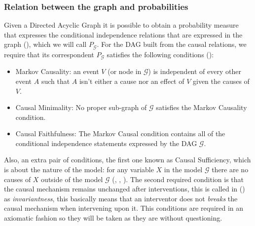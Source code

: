 \documentclass[english,letterpaper,12pt,final]{article}
\theoremstyle{definition}
\begin{document}
	\subsubsection{Relation between the graph and probabilities}
	Given a Directed Acyclic Graph it is possible to obtain a probability measure that expresses the conditional independence relations that are expressed in the graph (\cite{koller2009probabilistic}), which we will call $P_\mathcal{G}$. For the DAG built from the causal relations, we require that its correspondent $P_\mathcal{G}$ satisfies the following conditions (\cite{spirtes2000causation}):
	\begin{itemize}
	\item Markov Causality: an event $V$ (or node in $\mathcal{G}$) is independent of every other event $A$ such that $A$ isn't either a cause nor an effect of $V$ given the causes of $V$.
	\item Causal Minimality: No proper sub-graph of $\mathcal{G}$ satisfies the Markov Causality condition.
	\item Causal Faithfulness: The Markov Causal condition contains all of the conditional independence statements expressed by the DAG $\mathcal{G}$.
	\end{itemize}
	Also, an extra pair of conditions, the first one known as Causal Sufficiency, which is about the nature of the model: for any variable $X$ in the model $\mathcal{G}$ there are no causes of $X$ outside of the model $\mathcal{G}$ (\cite{spirtes2000causation}, \cite{pearl2009causality}, \cite{sucar2015probabilistic}). The second required condition is that the causal mechanism remains unchanged after interventions, this is called in (\cite{woodward2005making}) as \textit{invariantness}, this basically means that an interventor does not \textit{breaks} the causal mechanism when intervening upon it.
	This conditions are required in an axiomatic fashion so they will be taken as they are without questioning.
\end{document}
